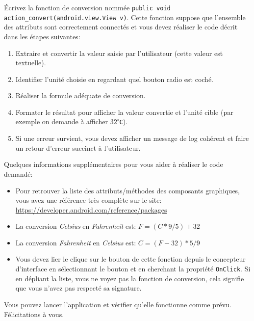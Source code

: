 \documentclass[a4paper,10pt]{article}
\begin{document}
Écrivez la fonction de conversion nommée \lstinline|public void action_convert(android.view.View v)|. Cette fonction suppose que l'ensemble des attributs sont correctement connectés et vous devez réaliser le code décrit dans les étapes suivantes:
\begin{enumerate}
	\item Extraire et convertir la valeur saisie par l'utilisateur (cette valeur est textuelle).
	\item Identifier l'unité choisie en regardant quel bouton radio est coché.
	\item Réaliser la formule adéquate de conversion.
	\item Formater le résultat pour afficher la valeur convertie et l'unité cible (par exemple on demande à afficher \texttt{$32^\circ$C}).
	\item Si une erreur survient, vous devez afficher un message de log cohérent et faire un retour d'erreur succinct à l'utilisateur.
\end{enumerate}

Quelques informations supplémentaires pour vous aider à réaliser le code demandé:
\begin{itemize}
	\item Pour retrouver la liste des attributs/méthodes des composants graphiques, vous avez une référence très complète sur le site: \url{https://developer.android.com/reference/packages}
	\item La conversion \textit{Celsius} en \textit{Fahrenheit} est: $F = (C * 9/5) + 32$
	\item La conversion \textit{Fahrenheit} en \textit{Celsius} est: $C = (F - 32) * 5/9$
	\item Vous devez lier le clique sur le bouton de cette fonction depuis le concepteur d'interface en sélectionnant le bouton et en cherchant la propriété \texttt{OnClick}. Si en dépliant la liste, vous ne voyez pas la fonction de conversion, cela signifie que vous n'avez pas respecté sa signature.
\end{itemize}

Vous pouvez lancer l'application et vérifier qu'elle fonctionne comme prévu. Félicitations à vous.
\end{document}
